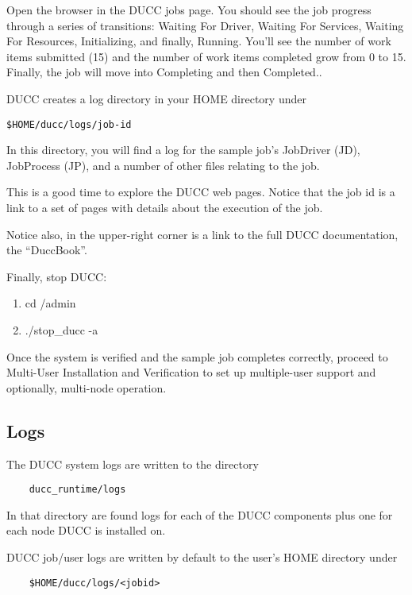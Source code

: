     Open the browser in the DUCC jobs page.  You should see the job progress through a series of
    transitions: Waiting For Driver, Waiting For Services, Waiting For Resources, Initializing, and
    finally, Running.  You'll see the number of work items submitted (15) and the number of work
    items completed grow from 0 to 15.  Finally, the job will move into Completing and then
    Completed..

    DUCC creates a log directory in your HOME directory under 
\begin{verbatim}
$HOME/ducc/logs/job-id
\end{verbatim}

    In this directory, you will find a log for the sample job's JobDriver (JD), JobProcess (JP), and
    a number of other files relating to the job.

    This is a good time to explore the DUCC web pages.  Notice that the job id is a link to a set of
    pages with details about the execution of the job.

    Notice also, in the upper-right corner is a link to the full DUCC documentation, the ``DuccBook''.

    Finally, stop DUCC:
    \begin{enumerate}
      \item cd \duccruntime/admin
      \item./stop\_ducc -a
      \end{enumerate}
      
      Once the system is verified and the sample job completes correctly, proceed to Multi-User
      Installation and Verification to set up multiple-user support and optionally, multi-node
      operation.

\subsection{Logs}
    The DUCC system logs are written to the directory
\begin{verbatim}
    ducc_runtime/logs
\end{verbatim}

    In that directory are found logs for each of the DUCC components plus one for each node DUCC is
    installed on.

    DUCC job/user logs are written by default to the user's HOME directory under
\begin{verbatim}
    $HOME/ducc/logs/<jobid>
\end{verbatim}

